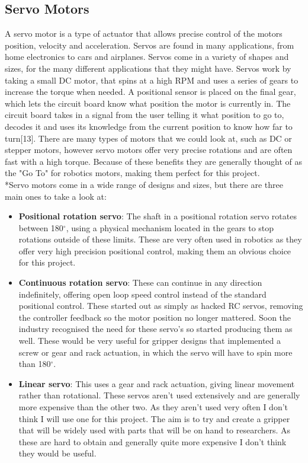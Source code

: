 \documentclass{l4proj}
\begin{document}
\subsection{Servo Motors}
A servo motor is a type of actuator that allows precise control of the motors position, velocity and acceleration. Servos are found in many applications, from home electronics to cars and airplanes. Servos come in a variety of shapes and sizes, for the many different applications that they might have. Servos work by taking a small DC motor, that spins at a high RPM and uses a series of gears to increase the torque when needed. A positional sensor is placed on the final gear, which lets the circuit board know what position the motor is currently in. The circuit board takes in a signal from the user telling it what position to go to, decodes it and uses its knowledge from the current position to know how far to turn[13]. There are many types of motors that we could look at, such as DC or stepper motors, however servo motors offer very precise rotations and are often fast with a high torque. Because of these benefits they are generally thought of as the "Go To" for robotics motors, making them perfect for this project. 
\\*Servo motors come in a wide range of designs and sizes, but there are three main ones to take a look at:
\begin{itemize}
	\item 
	\textbf{Positional rotation servo}: The shaft in a positional rotation servo rotates between 180$^{\circ}$, using a physical mechanism located in the gears to stop rotations outside of these limits. These are very often used in robotics as they offer very high precision positional control, making them an obvious choice for this project.
	
	\item
	\textbf{Continuous rotation servo}: These can continue in any direction indefinitely, offering open loop speed control instead of the standard positional control. These started out as simply as hacked RC servos, removing the controller feedback so the motor position no longer mattered. Soon the industry recognised the need for these servo's so started producing them as well. These would be very useful for gripper designs that implemented a screw or gear and rack actuation, in which the servo will have to spin more than 180$^{\circ}$.
	\item
	\textbf{Linear servo}: This uses a gear and rack actuation, giving linear movement rather than rotational. These servos aren't used extensively and are generally more expensive than the other two. As they aren't used very often I don't think I will use one for this project. The aim is to try and create a gripper that will be widely used with parts that will be on hand to researchers. As these are hard to obtain and generally quite more expensive I don't think they would be useful. 
\end{itemize}
\end{document}
